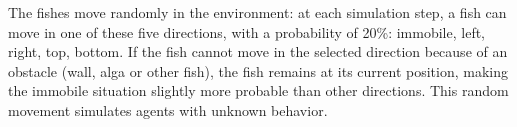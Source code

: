 \documentclass[conference]{IEEEtran}
\begin{document}
The fishes move randomly in the environment: at each simulation step, a fish can move in one of these five directions, with a probability of 20\%: immobile, left, right, top, bottom. If the fish cannot move in the selected direction because of an obstacle (wall, alga or other fish), the fish remains at its current position, making the immobile situation slightly more probable than other directions. This random movement simulates agents with unknown behavior.


\end{document}
